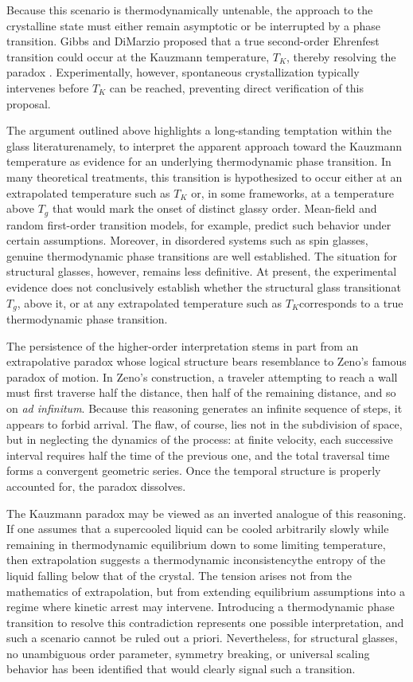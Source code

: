 Because this scenario is thermodynamically untenable, the approach to the crystalline state must either remain asymptotic or be interrupted by a phase transition. Gibbs and DiMarzio proposed that a true second-order Ehrenfest transition could occur at the Kauzmann temperature, $T_K$, thereby resolving the paradox \nolinebreak \cite{GibbsandDiMarzio,Gibbs2}. Experimentally, however, spontaneous crystallization typically intervenes before $T_K$ can be reached, preventing direct verification of this proposal.

The argument outlined above highlights a long-standing temptation within the glass literature\textemdash namely, to interpret the apparent approach toward the Kauzmann temperature as evidence for an underlying thermodynamic phase transition. In many theoretical treatments, this transition is hypothesized to occur either at an extrapolated temperature such as $T_K$ or, in some frameworks, at a temperature above $T_g$ that would mark the onset of distinct glassy order. Mean-field and random first-order transition models, for example, predict such behavior under certain assumptions. Moreover, in disordered systems such as spin glasses, genuine thermodynamic phase transitions are well established. The situation for structural glasses, however, remains less definitive. At present, the experimental evidence does not conclusively establish whether the structural glass transition\textemdash at $T_g$, above it, or at any extrapolated temperature such as $T_K$\textemdash corresponds to a true thermodynamic phase transition.

The persistence of the higher-order interpretation stems in part from an extrapolative paradox whose logical structure bears resemblance to Zeno’s famous paradox of motion. In Zeno’s construction, a traveler attempting to reach a wall must first traverse half the distance, then half of the remaining distance, and so on \emph{ad infinitum}. Because this reasoning generates an infinite sequence of steps, it appears to forbid arrival. The flaw, of course, lies not in the subdivision of space, but in neglecting the dynamics of the process: at finite velocity, each successive interval requires half the time of the previous one, and the total traversal time forms a convergent geometric series. Once the temporal structure is properly accounted for, the paradox dissolves.

The Kauzmann paradox may be viewed as an inverted analogue of this reasoning. If one assumes that a supercooled liquid can be cooled arbitrarily slowly while remaining in thermodynamic equilibrium down to some limiting temperature, then extrapolation suggests a thermodynamic inconsistency\textemdash the entropy of the liquid falling below that of the crystal. The tension arises not from the mathematics of extrapolation, but from extending equilibrium assumptions into a regime where kinetic arrest may intervene. Introducing a thermodynamic phase transition to resolve this contradiction represents one possible interpretation, and such a scenario cannot be ruled out a priori. Nevertheless, for structural glasses, no unambiguous order parameter, symmetry breaking, or universal scaling behavior has been identified that would clearly signal such a transition.

